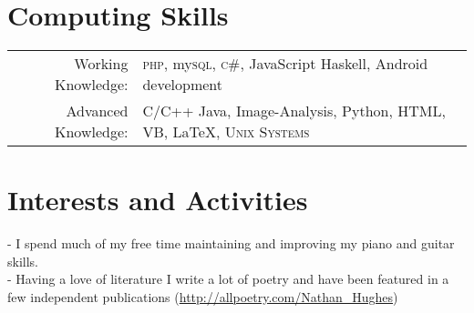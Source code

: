 \documentclass[a4paper,10pt]{article}
\begin{document}

\section{Computing Skills}
\begin{tabular}{rl}
  Working Knowledge:& \textsc{php}, my\textsc{sql}, \textsc{c\#}, JavaScript Haskell, Android  development  \\
  Advanced Knowledge:& C/C++ Java, Image-Analysis, Python, HTML, VB, \LaTeX, \textsc{Unix Systems}
\end{tabular}

\section{Interests and Activities}                                                                               
- I spend much of my free time maintaining and improving my piano and guitar skills.\\                                     
- Having a love of literature I write a lot of poetry and have been featured in a few independent  publications (\href{http://allpoetry.com/Nathan\_Hughes}{http://allpoetry.com/Nathan\_Hughes})
\end{document}
